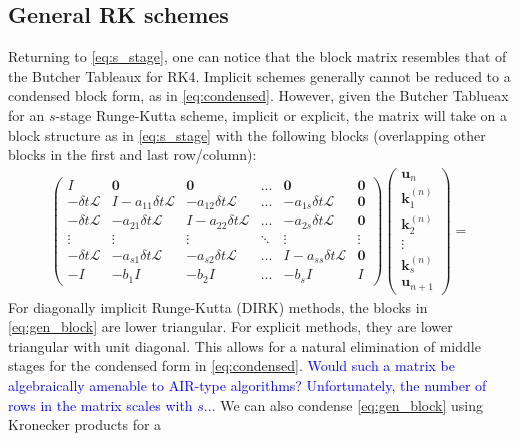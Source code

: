 \documentclass[a4paper,12pt]{article}
\newcommand{\tcb}{\textcolor{blue}}
\begin{document}
\subsection{General RK schemes}

Returning to \eqref{eq:s_stage}, one can notice that the block matrix resembles that of the Butcher Tableaux for RK4. 
Implicit schemes generally cannot be reduced to a condensed block form, as in \eqref{eq:condensed}. However, given the Butcher
Tablueax for an $s$-stage Runge-Kutta scheme, implicit or explicit, the matrix will take on a block structure as in \eqref{eq:s_stage}
with the following blocks (overlapping other blocks in the first and last row/column):
%
\begin{align} \label{eq:gen_block}
\begin{pmatrix} 
I  & \mathbf{0} & \mathbf{0} & ... & \mathbf{0} & \mathbf{0}\\
-\delta t\mathcal{L} & I - a_{11}\delta t\mathcal{L} & -a_{12}\delta t\mathcal{L} & ... &  -a_{1s}\delta t\mathcal{L} & \mathbf{0} \\
-\delta t\mathcal{L} & -a_{21}\delta t\mathcal{L} & I -a_{22}\delta t\mathcal{L} & ... & -a_{2s}\delta t\mathcal{L} & \mathbf{0} \\ 
\vdots  & \vdots & \vdots & \ddots & \vdots  & \vdots \\
-\delta t\mathcal{L} & -a_{s1}\delta t\mathcal{L} & -a_{s2}\delta t\mathcal{L} & ...  & I - a_{ss}\delta t\mathcal{L} & \mathbf{0} \\ 
-I & -b_1I & -b_2I & ... & -b_s I & I
\end{pmatrix}
\begin{pmatrix} \mathbf{u}_n \\ \mathbf{k}_1^{(n)} \\ \mathbf{k}_2^{(n)} \\ \vdots \\ \mathbf{k}_s^{(n)} \\ \mathbf{u}_{n+1} \end{pmatrix} =
\end{align}
%
For diagonally implicit Runge-Kutta (DIRK) methods, the blocks in \eqref{eq:gen_block} are lower triangular. For explicit
methods, they are lower triangular with unit diagonal. This allows for a natural elimination of middle stages for the condensed
form in \eqref{eq:condensed}. \tcb{Would such a matrix be algebraically amenable to AIR-type algorithms? Unfortunately, the
number of rows in the matrix scales with $s$...} We can also condense \eqref{eq:gen_block} using Kronecker products for a
\end{document}
